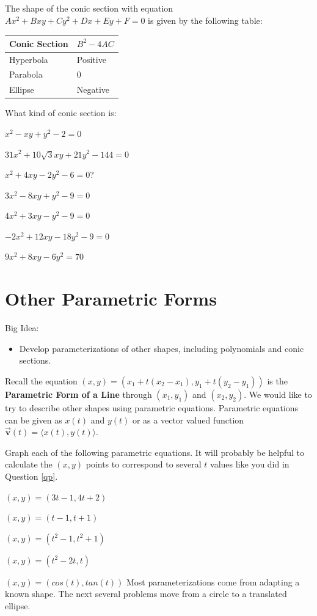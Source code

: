 \begin{info}
The shape of the conic section with equation $Ax^2+Bxy+Cy^2+Dx+Ey+F=0$ is given by the following table:

\begin{tabular}{| l | l |}
\hline
Conic Section & $B^2-4AC$ \\
\hline
\hline
Hyperbola & Positive \\
Parabola & 0 \\
Ellipse & Negative \\
\hline
\end{tabular}\end{info}


\bq What kind of conic section is:
\be
\item $x^2-xy+y^2-2=0$
\item $31x^2+10\sqrt{3}  xy+21y^2-144=0$
\item $x^2+4xy-2y^2-6=0$?
\item $3x^2-8xy+y^2-9=0$
\item $4x^2+3xy-y^2-9=0$
\item $-2x^2+12xy-18y^2-9=0$
\item $9x^2+8xy-6y^2=70$
\ee
\eq

\section{Other Parametric Forms}
Big Idea:
\begin{itemize}
\item Develop parameterizations of other shapes, including polynomials and conic sections.
\end{itemize}
\begin{info} Recall the equation $(x,y)=(x_1+t(x_2-x_1),y_1+t(y_2-y_1))$ is the \textbf{Parametric Form of a Line} through $(x_1,y_1)$ and $(x_2,y_2)$. We would like to try to describe other shapes using parametric equations. Parametric equations can be given as $x(t)$ and $y(t)$ or as a vector valued function $\vec{\textbf{v}}(t)= \langle x(t),y(t)\rangle$.
\end{info}
\bq Graph each of the following parametric equations. It will probably be helpful to calculate the $(x,y)$ points to correspond to several $t$ values like you did in Question \ref{qp}.
\be
\item $(x,y)=(3t-1,4t+2)$
\item $(x,y)=(t-1,t+1)$
\item $(x,y)=(t^2-1,t^2+1)$
\item $(x,y)=( t^2-2t,t)$
\item $(x,y)=(cos(t),tan(t))$
\ee
\eq
Most parameterizations come from adapting a known shape. The next several problems move from a circle to a translated ellipse.

